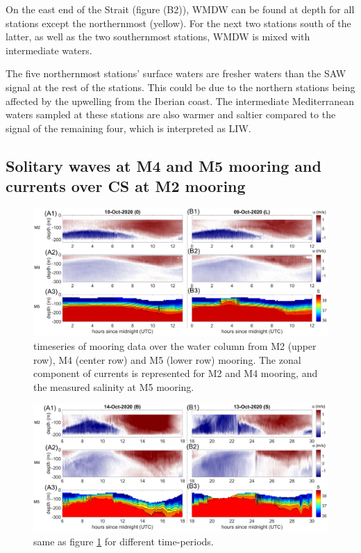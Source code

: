 On the east end of the Strait (figure (B2)), WMDW can be found at depth for all stations except the northernmost (yellow). For the next two stations south of the latter, as well as the two southernmost stations, WMDW is mixed with intermediate waters. 

The five northernmost stations' surface waters are fresher waters than the SAW signal at the rest of the stations. This could be due to the northern stations being affected by the upwelling from the Iberian coast. The intermediate Mediterranean waters sampled at these stations are also warmer and saltier compared to the signal of the remaining four, which is interpreted as LIW.


\subsection{Solitary waves at M4 and M5 mooring and currents over CS at M2 mooring}
\label{section_obs_moor}

\begin{figure}[!h]
 \includegraphics[width=\textwidth]{./GBR3D/US_moorings1.png}
 \caption {timeseries of mooring data over the water column from M2 (upper row), M4 (center row) and M5 (lower row) mooring. The zonal component of currents is represented for M2 and M4 mooring, and the measured salinity at M5 mooring.}
 \label{fig_moor_US1}
\end{figure}

\begin{figure}[!h]
 \includegraphics[width=\textwidth]{./GBR3D/US_moorings2.png}
 \caption {same as figure \ref{fig_moor_US1} for different time-periods.}
 \label{fig_moor_US2}
\end{figure}

